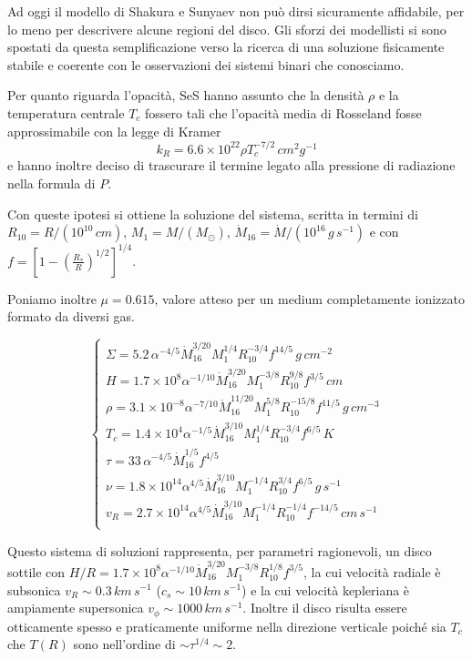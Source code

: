 \documentclass[a4paperbi]{article}
\begin{document}
Ad oggi il modello di Shakura e Sunyaev non può dirsi sicuramente affidabile, per lo meno per descrivere alcune regioni del disco. Gli sforzi dei modellisti si sono spostati da questa semplificazione verso la ricerca di una soluzione fisicamente stabile e coerente con le osservazioni dei sistemi binari che conosciamo.

Per quanto riguarda l'opacità, SeS hanno assunto che la densità $\rho$ e la temperatura centrale $T_c$ fossero tali che l'opacità media di Rosseland fosse approssimabile con la legge di Kramer
\begin{equation}
	k_R=6.6\times10^{22}\rho T_c^{-7/2}\,cm^2g^{-1}
\end{equation}
e hanno inoltre deciso di trascurare il termine legato alla pressione di radiazione nella formula di $P$.

Con queste ipotesi si ottiene la soluzione del sistema, scritta in termini di $R_{10}=R/(10^{10}\,cm)$, $M_{1}=M/(M_\odot)$, $\dot{M}_{16}=\dot{M}/(10^{16}\,g\,s^{-1})$ e con $f=\left[1-\left(\frac{R_*}{R}\right)^{1/2}\right]^{1/4}$. 

Poniamo inoltre $\mu=0.615$, valore atteso per un medium completamente ionizzato formato da diversi gas. 

\begin{equation}
	\begin{cases}
		\Sigma=5.2\,\alpha^{-4/5}\dot{M}_{16}^{3/20}M^{1/4}_1R_{10}^{-3/4}f^{14/5}\,g\,cm^{-2}\\
		H=1.7\times10^8\alpha^{-1/10}\dot{M}^{3/20}_{16}M^{-3/8}_1R_{10}^{9/8}f^{3/5}\,cm\\
		\rho=3.1\times10^{-8}\alpha^{-7/10}\dot{M}^{11/20}_{16}M^{5/8}_1R_{10}^{-15/8}f^{11/5}\,g\,cm^{-3}\\
		T_c=1.4\times10^{4}\alpha^{-1/5}\dot{M}^{3/10}_{16}M^{1/4}_1R_{10}^{-3/4}f^{6/5}\,K\\
		\tau=33\,\alpha^{-4/5}\dot{M}^{1/5}_{16}f^{4/5}\\
		\nu=1.8\times10^{14}\alpha^{4/5}\dot{M}^{3/10}_{16}M^{-1/4}_1R_{10}^{3/4}f^{6/5}\,g\,s^{-1}\\
		v_R=2.7\times10^{14}\alpha^{4/5}\dot{M}^{3/10}_{16}M^{-1/4}_1R_{10}^{-1/4}f^{-14/5}\,cm\,s^{-1}\\
	\end{cases}
\end{equation}

	Questo sistema di soluzioni rappresenta, per parametri ragionevoli, un disco sottile con $H/R=1.7\times10^8\alpha^{-1/10}\dot{M}^{3/20}_{16}M^{-3/8}_1R_{10}^{1/8}f^{3/5}$, la cui velocità radiale è subsonica $v_R\sim 0.3\,km\,s^{-1}$ ($c_s\sim10\,km\,s^{-1}$) e la cui velocità kepleriana è ampiamente supersonica $v_\phi\sim1000\,km\,s^{-1}$. Inoltre il disco risulta essere otticamente spesso e praticamente uniforme nella direzione verticale poiché sia $T_c$ che $T(R)$ sono nell'ordine di $\sim\tau^{1/4}\sim2$.
\end{document}

